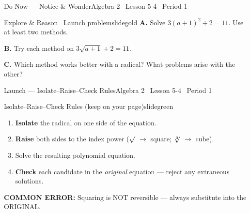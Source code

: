 \documentclass[aspectratio=169, 11pt]{beamer}
\begin{document}

\begin{frame}{Do Now --- Notice \& Wonder}{Algebra 2 \textperiodcentered\ Lesson 5-4 \textperiodcentered\ Period 1}
\vspace{0.2cm}
\begin{projcard}{Explore \& Reason \textperiodcentered\ Launch problem}{slidegold}
\textbf{A.} Solve \(3(a+1)^2 + 2 = 11\). Use at least two methods.

\vspace{0.15cm}
\textbf{B.} Try each method on \(3\sqrt{a+1} + 2 = 11\).

\vspace{0.15cm}
\textbf{C.} Which method works better with a radical? What problems arise with the other?
\end{projcard}
\end{frame}

\begin{frame}{Launch --- Isolate--Raise--Check Rules}{Algebra 2 \textperiodcentered\ Lesson 5-4 \textperiodcentered\ Period 1}
\vspace{0.2cm}
\begin{projcard}{Isolate--Raise--Check Rules (keep on your page)}{slidegreen}
\begin{enumerate}
  \setlength{\itemsep}{0pt}
  \item \textbf{Isolate} the radical on one side of the equation.
  \item \textbf{Raise} both sides to the index power (\(\sqrt{\vphantom{x}}\) \(\rightarrow\) square; \(\sqrt[3]{\vphantom{x}}\) \(\rightarrow\) cube).
  \item Solve the resulting polynomial equation.
  \item \textbf{Check} each candidate in the \emph{original} equation --- reject any extraneous solutions.
\end{enumerate}

\vspace{0.1cm}
\textcolor{slideaccent}{\textbf{COMMON ERROR:} Squaring is NOT reversible --- always substitute into the ORIGINAL.}
\end{projcard}
\end{frame}
\end{document}
